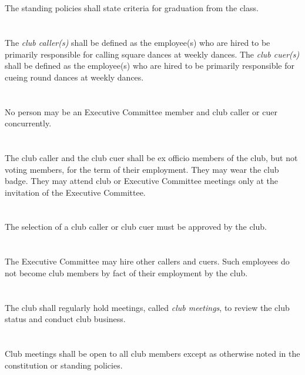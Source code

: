 \documentclass{bylaws}
\begin{document}
\section{}The standing policies shall state criteria for graduation from the class.


\section{}The \textit{club caller(s)} shall be defined as the employee(s) who are hired to be primarily responsible for calling square dances at weekly dances. The \textit{club cuer(s)} shall be defined as the employee(s) who are hired to be primarily responsible for cueing round dances at weekly dances.
\section{}No person may be an Executive Committee member and club caller or cuer concurrently.
\section{}The club caller and the club cuer shall be ex officio members of the club, but not voting members, for the term of their employment.  They may wear the club badge.  They may attend club or Executive Committee meetings only at the invitation of the Executive Committee.
\section{}The selection of a club caller or club cuer must be approved by the club.
\section{}The Executive Committee may hire other callers and cuers.  Such employees do not become club members by fact of their employment by the club.


\section{}The club shall regularly hold meetings, called \textit{club meetings}, to review the club status and conduct club business.
\section{}Club meetings shall be open to all club members except as otherwise noted in the constitution or standing policies.
\end{document}
